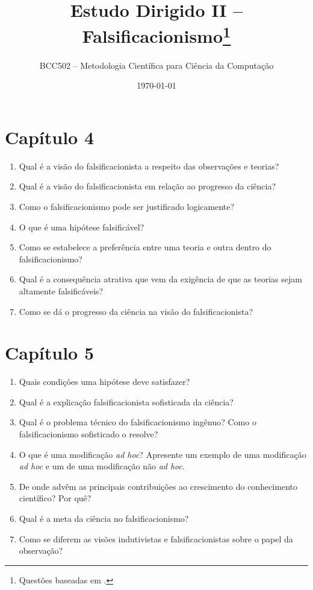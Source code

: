 \documentclass[10pt,a4paper]{extarticle}
\title{Estudo Dirigido II -- Falsificacionismo\footnote{Questões baseadas em \citep{chalmers1993}.}}
\author{BCC502 -- Metodologia Científica para Ciência da Computação}
\date{\today}
\begin{document}
\vspace{-1cm}
\maketitle

\section*{Capítulo 4}
\begin{enumerate}[label=\textbf{\arabic*.}, itemsep=6pt]
  \item Qual é a visão do falsificacionista a respeito das observações e teorias?
  \item Qual é a visão do falsificacionista em relação ao progresso da ciência?
  \item Como o falsificacionismo pode ser justificado logicamente?
  \item O que é uma hipótese falsificável?
  \item Como se estabelece a preferência entre uma teoria e outra dentro do falsificacionismo?
  \item Qual é a consequência atrativa que vem da exigência de que as teorias sejam altamente falsificáveis?
  \item Como se dá o progresso da ciência na visão do falsificacionista?
\end{enumerate}

\section*{Capítulo 5}
\begin{enumerate}[resume, label=\textbf{\arabic*.}, itemsep=6pt]
  \item Quais condições uma hipótese deve satisfazer?
  \item Qual é a explicação falsificacionista sofisticada da ciência?
  \item Qual é o problema técnico do falsificacionismo ingênuo? Como o falsificacionismo sofisticado o resolve?
  \item O que é uma modificação \emph{ad hoc}? Apresente um exemplo de uma modificação \emph{ad hoc} e um de uma modificação não \emph{ad hoc}.
  \item De onde advêm as principais contribuições ao crescimento do conhecimento científico? Por quê?
  \item Qual é a meta da ciência no falsificacionismo?
  \item Como se diferem as visões indutivistas e falsificacionistas sobre o papel da observação?
\end{enumerate}
\end{document}
